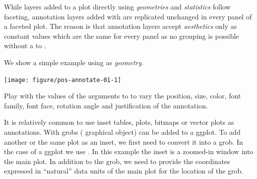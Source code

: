 \documentclass[krantz2]{krantz}\usepackage{knitr}%
\begin{document}
\begin{warningbox}
While layers added to a plot directly using \emph{geometries} and \emph{statistics} follow faceting, annotation layers added with  are replicated unchanged in every panel of a faceted plot. The reason is that annotation layers accept \emph{aesthetics} only as constant values which are the same for every panel as no grouping is possible without a  to .
\end{warningbox}

We show a simple example using  as \emph{geometry}.

\begin{knitrout}\footnotesize
{}\color{fgcolor}\begin{kframe}
\begin{alltt}
  \hlopt{+}
  \hlstd{()} \hlopt{+}
  \hlstd{(} \hlstd{=} \hlstd{,}
            \hlstd{=} \hlstd{,}
            \hlstd{=} \hlstd{,}  \hlstd{=} \hlstd{,}
            \hlstd{=} \hlstd{,}
           \hlstd{=}\hlstd{)}
\end{alltt}
\end{kframe}

{\centering \texttt{[image: figure/pos-annotate-01-1]} 

}



\end{knitrout}

\begin{playground}
Play with the values of the arguments to  to vary the position, size, color, font family, font face, rotation angle and justification of the annotation.
\end{playground}

It is relatively common to use inset tables, plots, bitmaps or vector plots as annotations. With  grobs ( graphical object) can be added to a ggplot. To add another or the same plot as an inset, we first need to convert it into a grob. In the case of a ggplot we use . In this example the inset is a zoomed-in window into the main plot. In addition to the grob, we need to provide the coordinates expressed in ``natural'' data units of the main plot for the location of the grob.
\end{document}
